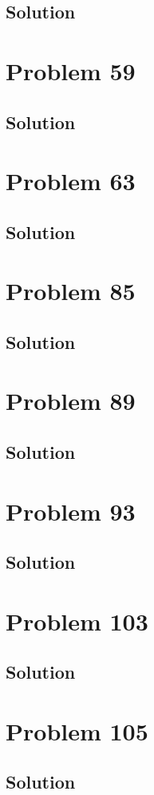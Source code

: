 \documentclass[12pt]{article}
\begin{document}
    \subsection{Solution}

    \pagebreak
    \section{Problem 59}

    \subsection{Solution}

    \pagebreak
    \section{Problem 63}

    \subsection{Solution}

    \pagebreak
    \section{Problem 85}

    \subsection{Solution}

    \pagebreak
    \section{Problem 89}

    \subsection{Solution}

    \pagebreak
    \section{Problem 93}

    \subsection{Solution}

    \pagebreak
    \section{Problem 103}

    \subsection{Solution}

    \pagebreak
    \section{Problem 105}

    \subsection{Solution}

    \pagebreak

    \tableofcontents
\end{document}
